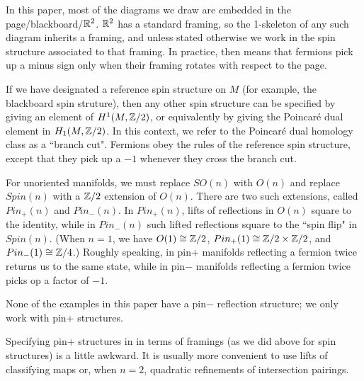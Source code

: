 In this paper, most of the diagrams we draw are embedded in the page/blackboard/$\mathbb{R}^2$.
$\mathbb{R}^2$ has a standard framing, so the 1-skeleton of any such diagram inherits a framing, and unless stated otherwise we work in the spin
structure associated to that framing.
In practice, then means that fermions pick up a minus sign only when their framing rotates with respect to the page.

If we have designated a reference spin structure on $M$ (for example, the blackboard spin struture), 
then any other spin structure can be specified by giving an
element of $H^1(M, \mathbb{Z}/2)$, or equivalently by giving the Poincar\'e dual element in $H_1(M, \mathbb{Z}/2)$.
In this context, we refer to the Poincar\'e dual homology class as a ``branch cut".
Fermions obey the rules of the reference spin structure, except that they pick up a $-1$ whenever they cross the branch cut.

\medskip

For unoriented manifolds, we must replace $SO(n)$ with $O(n)$ and replace $Spin(n)$ with a $\mathbb{Z}/2$ extension of $O(n)$.
There are two such extensions, called $Pin_+(n)$ and $Pin_-(n)$.
In $Pin_+(n)$, lifts of reflections in $O(n)$ square to the identity, while in $Pin_-(n)$ such lifted reflections square to the ``spin flip"
in $Spin(n)$.
(When $n=1$, we have $O(1)\cong\mathbb{Z}/2$, $Pin_+(1)\cong\mathbb{Z}/2\times\mathbb{Z}/2$, and $Pin_-(1)\cong\mathbb{Z}/4$.)
Roughly speaking, in pin+ manifolds reflecting a fermion twice returns us to the same state, while in pin$-$ manifolds reflecting a fermion twice
picks op a factor of $-1$.

None of the examples in this paper have a pin$-$ reflection structure; we only work with pin+ structures.

Specifying pin+ structures in in terms of framings (as we did above for spin structures) is a little awkward.
It is usually more convenient to use lifts of classifying maps or, when $n=2$, quadratic refinements of intersection pairings.

